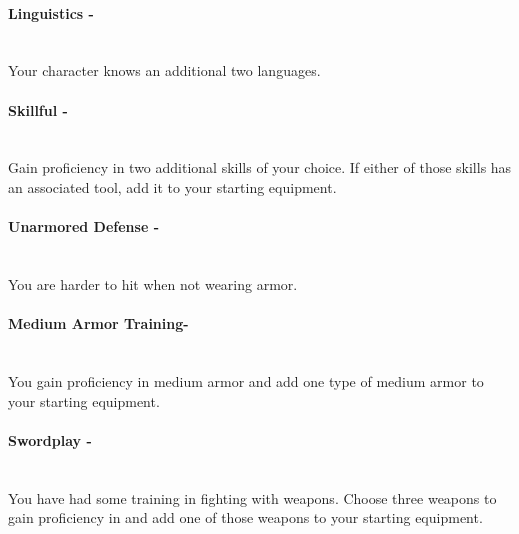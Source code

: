 \paragraph{Linguistics - } ~\\
\indent Your character knows an additional two languages.

\paragraph{Skillful -} ~\\
\indent Gain proficiency in two additional skills of your choice.
\indent If either of those skills has an associated tool, add it to
\indent your starting equipment.

\paragraph{Unarmored Defense -} ~\\
\indent You are harder to hit when not wearing armor.

\paragraph{Medium Armor Training- } ~\\
\indent You gain proficiency in medium armor and add one
\indent type of medium armor to your starting equipment.

\paragraph{Swordplay -} ~\\
\indent You have had some training in fighting with weapons. 
\indent Choose three weapons to gain proficiency in and add 
\indent one of those weapons to your starting equipment.